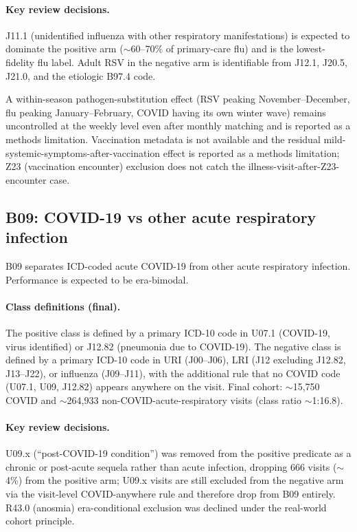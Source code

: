 \documentclass[utf8]{frontiers_suppmat} %
\begin{document}
\paragraph{Key review decisions.} J11.1 (unidentified influenza with
other respiratory manifestations) is expected to dominate the positive
arm ($\sim$60--70\% of primary-care flu) and is the lowest-fidelity
flu label. Adult RSV in the negative arm is identifiable from J12.1,
J20.5, J21.0, and the etiologic B97.4 code.

A within-season pathogen-substitution effect (RSV peaking November--December,
flu peaking January--February, COVID having its own winter wave)
remains uncontrolled at the weekly level even after monthly matching
and is reported as a methods limitation. Vaccination metadata is not
available and the residual mild-systemic-symptoms-after-vaccination
effect is reported as a methods limitation; Z23 (vaccination encounter)
exclusion does not catch the illness-visit-after-Z23-encounter case.

\subsection{B09: COVID-19 vs other acute respiratory infection}
\label{sec:supp-b09}

B09 separates ICD-coded acute COVID-19 from other acute respiratory
infection. Performance is expected to be era-bimodal.

\paragraph{Class definitions (final).} The positive class is defined
by a primary ICD-10 code in U07.1 (COVID-19, virus identified) or
J12.82 (pneumonia due to COVID-19). The negative class is defined
by a primary ICD-10 code in URI (J00--J06), LRI (J12 excluding J12.82,
J13--J22), or influenza (J09--J11), with the additional
rule that no COVID code (U07.1, U09, J12.82) appears anywhere
on the visit. Final cohort: $\sim$15{,}750 COVID and $\sim$264{,}933
non-COVID-acute-respiratory visits (class ratio $\sim$1:16.8).

\paragraph{Key review decisions.} U09.x (``post-COVID-19 condition'') was
removed from the positive predicate as a chronic or post-acute
sequela rather than acute infection, dropping 666 visits ($\sim$4\%)
from the positive arm; U09.x visits are still excluded from the
negative arm via the visit-level COVID-anywhere rule and therefore
drop from B09 entirely. R43.0 (anosmia) era-conditional exclusion
was declined under the real-world cohort principle.
\end{document}
